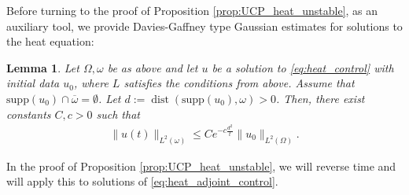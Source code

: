 \documentclass[12pt,twoside]{amsart}
\numberwithin{equation}{section}
\renewcommand{\leq}{\leqslant}
\newtheorem{lemma}[theorem]{Lemma}
\DeclareMathOperator {\dist} {dist}
\newcommand{\supp}{\mathrm{supp}}
\begin{document}
Before turning to the proof of Proposition \ref{prop:UCP_heat_unstable}, as an auxiliary tool, we provide Davies-Gaffney type Gaussian estimates for solutions to the heat equation:

\begin{lemma}
\label{lem:Gaussian_ests}
Let $\Omega, \omega$ be as above and
let $u$ be a solution to \eqref{eq:heat_control} with initial data $u_0$, where $L$ satisfies the conditions from above. Assume that $\supp(u_0)\cap \overline{\omega} = \emptyset$. Let $d:= \dist(\supp(u_0),\omega)>0$. Then, there exist constants $C,c>0$ such that
\begin{align*}
\|u(t)\|_{L^2(\omega )} \leq C e^{- c\frac{d^2}{t}} \|u_0\|_{L^2(\Omega)}.
\end{align*}
\end{lemma}

In the proof of Proposition \ref{prop:UCP_heat_unstable}, we will reverse time and will apply this to solutions of \eqref{eq:heat_adjoint_control}.
\end{document}
